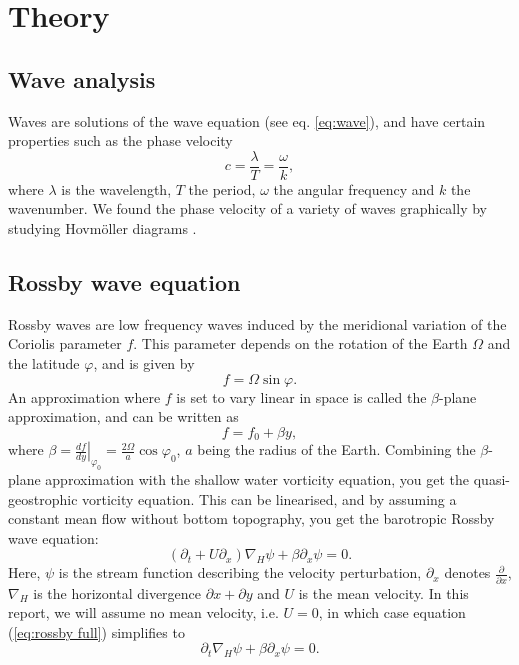 \section{Theory}
\label{sec:theory}

\subsection{Wave analysis}
\label{sec:waves}
Waves are solutions of the wave equation (see eq. \ref{eq:wave}), and have certain properties such as the phase velocity
	\begin{equation}
	\label{eq:phase}
		c = \frac{\lambda}{T} = \frac{\omega}{k},
	\end{equation}
where $\lambda$ is the wavelength, $T$ the period, $\omega$ the angular frequency and $k$ the wavenumber.
We found the phase velocity of a variety of waves graphically by studying Hovmöller diagrams \citep{hovmoller}.

\subsection{Rossby wave equation}
\label{sec:wave}
Rossby waves are low frequency waves induced by the meridional
variation of the Coriolis parameter $f$. This parameter depends on the rotation of the Earth $\Omega$ and the latitude $\varphi$, and is given by
\begin{equation}
	f = \Omega \sin{\varphi}.
\end{equation}
An approximation where $f$ is set to vary linear in space is called the $\beta$-plane approximation, and can be written as
\begin{equation}\label{beta-plane}
	f = f_0 + \beta y,
\end{equation}
where $\beta = \left.\frac{df}{dy}\right|_{\varphi_0} = \frac{2\Omega}{a} \cos{\varphi_0}$, $a$ being the radius of the Earth. Combining the $\beta$-plane approximation with the shallow water vorticity equation, you get the quasi-geostrophic vorticity equation. This can be linearised, and by assuming a constant mean flow without bottom topography, you get the barotropic Rossby wave equation:
\begin{equation}\label{eq:rossby full}
	\left(\partial_t + U\partial_x \right) \nabla_H \psi + \beta \partial_x \psi = 0.
\end{equation}
Here, $\psi$ is the stream function describing the velocity perturbation, $\partial_x$ denotes $\frac{\partial}{\partial x}$, $\nabla_H$ is the horizontal divergence $\partial x + \partial y$ and $U$ is the mean velocity. In this report, we will assume no mean velocity, i.e. $U=0$, in which case equation (\ref{eq:rossby full}) simplifies to
\begin{equation}\label{eq:rossby}
	\partial_t \nabla_H \psi + \beta \partial_x \psi = 0.
\end{equation}

